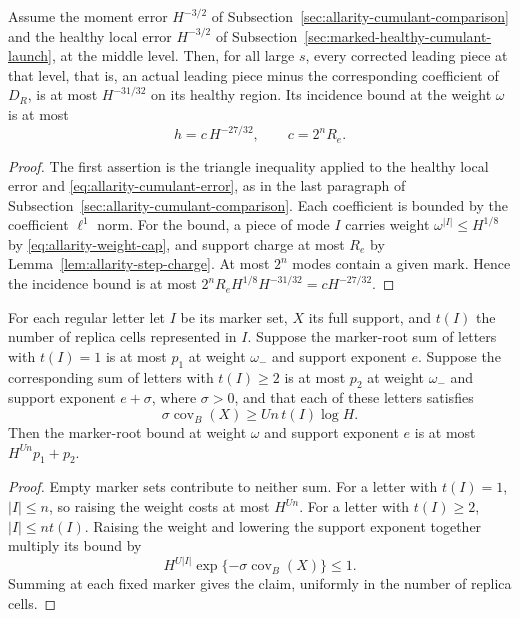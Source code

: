 \begin{lemma}
\label{lem:allarity-corrected-pieces}
Assume the moment error $H^{-3/2}$ of
Subsection~\ref{sec:allarity-cumulant-comparison} and the healthy local error
$H^{-3/2}$ of Subsection~\ref{sec:marked-healthy-cumulant-launch}, at the
middle level. Then, for all large $s$, every corrected leading piece at
that level, that is, an actual leading piece minus the corresponding
coefficient of $D_R$, is at most $H^{-31/32}$ on its healthy region. Its
incidence bound at the weight $\omega$ is at most
\[
 h=c\,H^{-27/32},\qquad c=2^nR_e .
\]
\end{lemma}
\begin{proof}
The first assertion is the triangle inequality applied to the healthy
local error and \eqref{eq:allarity-cumulant-error}, as in the last
paragraph of Subsection~\ref{sec:allarity-cumulant-comparison}. Each
coefficient is bounded by the coefficient $\ell^1$ norm. For the bound, a
piece of mode $I$ carries weight $\omega^{|I|}\le H^{1/8}$ by
\eqref{eq:allarity-weight-cap}, and support charge at most $R_e$ by
Lemma~\ref{lem:allarity-step-charge}. At most $2^n$ modes contain a given
mark. Hence the incidence bound is at most
$2^nR_eH^{1/8}H^{-31/32}=cH^{-27/32}$.
\end{proof}

\begin{lemma}
\label{lem:allarity-weight-raise}
For each regular letter let $I$ be its marker set, $X$ its full support,
and $t(I)$ the number of replica cells represented in $I$. Suppose the
marker-root sum of letters with $t(I)=1$ is at most $p_1$ at weight
$\omega_-$ and support exponent $e$. Suppose the corresponding sum of
letters with $t(I)\ge2$ is at most $p_2$ at weight $\omega_-$ and support
exponent $e+\sigma$, where $\sigma>0$, and that each of these letters
satisfies
\[
 \sigma\operatorname{cov}_B(X)\ge Un\,t(I)\log H .
\]
Then the marker-root bound at weight $\omega$ and support exponent $e$
is at most $H^{Un}p_1+p_2$.
\end{lemma}
\begin{proof}
Empty marker sets contribute to neither sum. For a letter with
$t(I)=1$, $|I|\le n$, so raising the weight costs at most $H^{Un}$.
For a letter with $t(I)\ge2$, $|I|\le nt(I)$. Raising the weight and
lowering the support exponent together multiply its bound by
\[
 H^{U|I|}\exp\{-\sigma\operatorname{cov}_B(X)\}\le1.
\]
Summing at each fixed marker gives the claim, uniformly in the number
of replica cells.
\end{proof}

